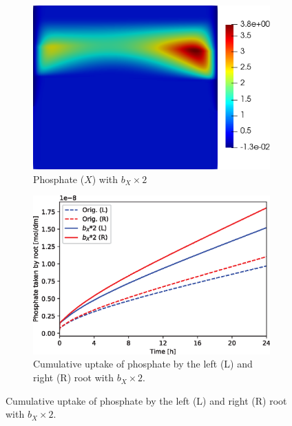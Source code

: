 \documentclass[11pt]{article}
\numberwithin{equation}{section}
\begin{document}
\begin{figure}[!htb]
\centering
\begin{subfigure}[t]{0.35\textwidth}
    \includegraphics[width=\textwidth]{Figures/X_bXtimes2.png}
    \caption{Phosphate ($X$) with $b_X \times 2$}
    \label{fig:numexp_bxup1}
\end{subfigure}
\hspace{1cm}
\begin{subfigure}[t]{0.4\textwidth}
    \includegraphics[width=\textwidth]{Figures/bxtimes2.eps}
    \caption{Cumulative uptake of phosphate by the left (L) and right (R) root with $b_X \times 2$.}
    \label{fig:numexp_bxup2}
\end{subfigure}


\end{figure}
\end{document}
